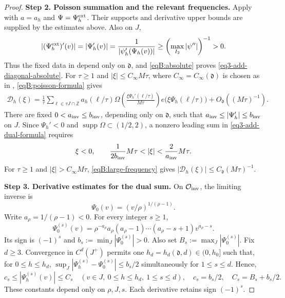 \documentclass[reqno,12pt]{amsart}
\def \Z {\mathbb Z}
\numberwithin{equation}{section}
\begin{document}
\begin{proof}
\medskip
\noindent\textbf{Step 2. Poisson summation and the relevant frequencies.}
Apply  with
$a=a_h$ and $\Psi=\Psi_h^{\rm ext}$.
Their supports and derivative upper bounds are supplied by the estimates
above. Also on $J$, 
\[
 |(\Psi_h^{\rm ext})'(v)|=|\Psi_h'(v)|
 =\frac1{|\psi_h'(\Psi_h(v))|}
 \ge\left(\max_{I_2}|\psi''|\right)^{-1}>0.
\]
Thus the fixed data in  depend only on $\mathfrak d$, and
\eqref{eqB:absolute} proves
\eqref{eq3-add-diagonal-absolute}.
For $\tau\ge1$ and $|\xi|\le C_\infty M\tau$, where
$C_\infty=C_\infty(\mathfrak d)$ is chosen as in
, \eqref{eqB:poisson-formula}
gives
\begin{equation}
 \begin{split}
 \mathcal D_h(\xi)=\frac1\tau
 \sum_{\ell\in\tau J\cap\Z}a_h(\ell/\tau)
 \Omega\left(\frac{\xi\Psi_h'(\ell/\tau)}{M\tau}\right)
 e\bigl(\xi\Psi_h(\ell/\tau)\bigr)
 +O_{\mathfrak d}((M\tau)^{-1}).
 \end{split}
 \label{eq3-add-dual-formula}
\end{equation}
There are fixed $0<a_{\rm inv}\le b_{\rm inv}$, depending only on
$\mathfrak d$, such that
$a_{\rm inv}\le|\Psi_h'|\le b_{\rm inv}$ on $J$.
Since $\Psi_h'<0$ and $\operatorname{supp}\Omega\subset(1/2,2)$,
a nonzero leading sum in \eqref{eq3-add-dual-formula} requires
\[
 \xi<0,\qquad
 \frac1{2b_{\rm inv}}M\tau<|\xi|<\frac2{a_{\rm inv}}M\tau.
\]
For $\tau\ge1$ and $|\xi|>C_\infty M\tau$, \eqref{eqB:large-frequency}
gives $|\mathcal D_h(\xi)|\le C_{\mathfrak d}(M\tau)^{-1}$.

\medskip
\noindent\textbf{Step 3. Derivative estimates for the dual sum.}
On $\mathcal O_{\rm inv}$, the limiting inverse is
\begin{equation}
 \Psi_0(v)=(v/\rho)^{1/(\rho-1)}.
 \label{eq3-add-limiting-inverse}
\end{equation}
Write $a_\rho=1/(\rho-1)<0$. For every integer $s\ge1$,
\[
 \Psi_0^{(s)}(v)
 =\rho^{-a_\rho}a_\rho(a_\rho-1)\cdots(a_\rho-s+1)v^{a_\rho-s}.
\]
Its sign is $(-1)^s$ and
$b_s:=\min_J|\Psi_0^{(s)}|>0$. Also set
$B_s:=\max_J|\Psi_0^{(s)}|$.
Fix $d\ge3$. Convergence in $C^d(J^+)$ permits one
$h_d=h_d(\mathfrak d,d)\in(0,h_0]$ such that, for $0\le h\le h_d$,
$\sup_J|\Psi_h^{(s)}-\Psi_0^{(s)}|\le b_s/2$ simultaneously for
$1\le s\le d$. Hence,
\begin{equation}
 c_s\le|\Psi_h^{(s)}(v)|\le C_s
       \quad(v\in J,\ 0\le h\le h_d,\ 1\le s\le d),
 \quad c_s=b_s/2,\quad C_s=B_s+b_s/2.
 \label{eq3-add-inverse-derivatives}
\end{equation}
These constants depend only on $\rho,J,s$. Each derivative retains sign $(-1)^s$.


\end{proof}
\end{document}
